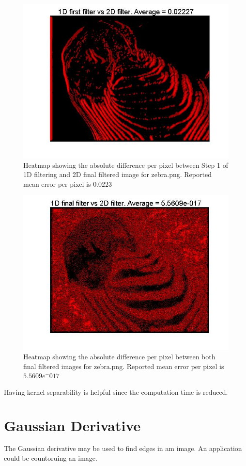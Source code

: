 \documentclass[11pt]{article}
\begin{document}
\begin{figure}[H]
	\centering
	\includegraphics[width=.9\textwidth]{imgs/zebra_col_heatmap.jpg}
	\caption{Heatmap showing the absolute difference per pixel between Step 1 of 1D filtering and 2D final filtered image for zebra.png. Reported mean error per pixel is $0.0223$}
	\label{fig:zebra_col_heatmap}
\end{figure}

\begin{figure}[H]
	\centering
	\includegraphics[width=.9\textwidth]{imgs/zebra_heatmap.jpg}
	\caption{Heatmap showing the absolute difference per pixel between both final filtered images for zebra.png. Reported mean error per pixel is $5.5609 e^-017$}
	\label{fig:zebra_heatmap}
\end{figure}

Having kernel separability is helpful since the computation time is reduced. 

\section{Gaussian Derivative}


The Gaussian derivative may be used to find edges in am image. An application could be countoruing an image.
\end{document}
